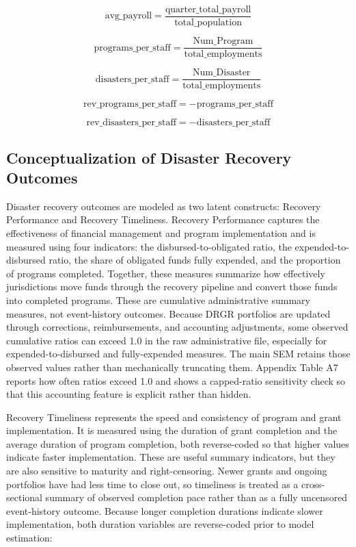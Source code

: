 \documentclass[
  number]{elsarticle}
\begin{document}
\[\text{avg\_payroll} = \frac{\text{quarter\_total\_payroll}}{\text{total\_population}}\]

\[\text{programs\_per\_staff} = \frac{\text{Num\_Program}}{\text{total\_employments}}\]

\[\text{disasters\_per\_staff} = \frac{\text{Num\_Disaster}}{\text{total\_employments}}\]

\[\text{rev\_programs\_per\_staff} = -\text{programs\_per\_staff}\]

\[\text{rev\_disasters\_per\_staff} = -\text{disasters\_per\_staff}\]

\subsection{Conceptualization of Disaster Recovery
Outcomes}\label{conceptualization-of-disaster-recovery-outcomes}

Disaster recovery outcomes are modeled as two latent constructs:
Recovery Performance and Recovery Timeliness. Recovery Performance
captures the effectiveness of financial management and program
implementation and is measured using four indicators: the
disbursed-to-obligated ratio, the expended-to-disbursed ratio, the share
of obligated funds fully expended, and the proportion of programs
completed. Together, these measures summarize how effectively
jurisdictions move funds through the recovery pipeline and convert those
funds into completed programs. These are cumulative administrative
summary measures, not event-history outcomes. Because DRGR portfolios
are updated through corrections, reimbursements, and accounting
adjustments, some observed cumulative ratios can exceed 1.0 in the raw
administrative file, especially for expended-to-disbursed and
fully-expended measures. The main SEM retains those observed values
rather than mechanically truncating them. Appendix Table A7 reports how
often ratios exceed 1.0 and shows a capped-ratio sensitivity check so
that this accounting feature is explicit rather than hidden.

Recovery Timeliness represents the speed and consistency of program and
grant implementation. It is measured using the duration of grant
completion and the average duration of program completion, both
reverse-coded so that higher values indicate faster implementation.
These are useful summary indicators, but they are also sensitive to
maturity and right-censoring. Newer grants and ongoing portfolios have
had less time to close out, so timeliness is treated as a
cross-sectional summary of observed completion pace rather than as a
fully uncensored event-history outcome. Because longer completion
durations indicate slower implementation, both duration variables are
reverse-coded prior to model estimation:
\end{document}
